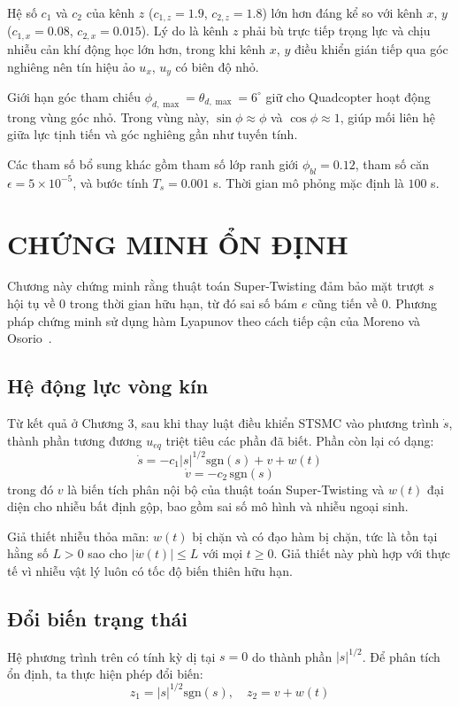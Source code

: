 \documentclass[12pt,a4paper]{report}
\begin{document}
Hệ số $c_1$ và $c_2$ của kênh $z$ ($c_{1,z} = 1.9$, $c_{2,z} = 1.8$) lớn hơn đáng kể so với kênh $x$, $y$ ($c_{1,x} = 0.08$, $c_{2,x} = 0.015$). Lý do là kênh $z$ phải bù trực tiếp trọng lực và chịu nhiễu cản khí động học lớn hơn, trong khi kênh $x$, $y$ điều khiển gián tiếp qua góc nghiêng nên tín hiệu ảo $u_x$, $u_y$ có biên độ nhỏ.

Giới hạn góc tham chiếu $\phi_{d,\max} = \theta_{d,\max} = 6^\circ$ giữ cho Quadcopter hoạt động trong vùng góc nhỏ. Trong vùng này, $\sin\phi \approx \phi$ và $\cos\phi \approx 1$, giúp mối liên hệ giữa lực tịnh tiến và góc nghiêng gần như tuyến tính.

Các tham số bổ sung khác gồm tham số lớp ranh giới $\phi_{bl} = 0.12$, tham số căn $\epsilon = 5 \times 10^{-5}$, và bước tính $T_s = 0.001$ s. Thời gian mô phỏng mặc định là $100$ s.


\chapter{CHỨNG MINH ỔN ĐỊNH}

Chương này chứng minh rằng thuật toán Super-Twisting đảm bảo mặt trượt $s$ hội tụ về $0$ trong thời gian hữu hạn, từ đó sai số bám $e$ cũng tiến về $0$. Phương pháp chứng minh sử dụng hàm Lyapunov theo cách tiếp cận của Moreno và Osorio~\cite{moreno2012}.

\section{Hệ động lực vòng kín}
Từ kết quả ở Chương 3, sau khi thay luật điều khiển STSMC vào phương trình $\dot{s}$, thành phần tương đương $u_{eq}$ triệt tiêu các phần đã biết. Phần còn lại có dạng:
\begin{equation}
\dot{s} = -c_1 |s|^{1/2} \text{sgn}(s) + v + w(t)
\end{equation}
\begin{equation}
\dot{v} = -c_2 \, \text{sgn}(s)
\end{equation}
trong đó $v$ là biến tích phân nội bộ của thuật toán Super-Twisting và $w(t)$ đại diện cho nhiễu bất định gộp, bao gồm sai số mô hình và nhiễu ngoại sinh.

Giả thiết nhiễu thỏa mãn: $w(t)$ bị chặn và có đạo hàm bị chặn, tức là tồn tại hằng số $L > 0$ sao cho $|\dot{w}(t)| \le L$ với mọi $t \ge 0$. Giả thiết này phù hợp với thực tế vì nhiễu vật lý luôn có tốc độ biến thiên hữu hạn.

\section{Đổi biến trạng thái}
Hệ phương trình trên có tính kỳ dị tại $s = 0$ do thành phần $|s|^{1/2}$. Để phân tích ổn định, ta thực hiện phép đổi biến:
\begin{equation}
z_1 = |s|^{1/2} \text{sgn}(s), \quad z_2 = v + w(t)
\end{equation}
\end{document}
